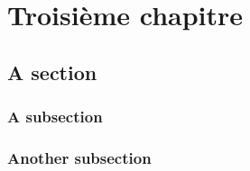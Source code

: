 
\chapter{Troisième chapitre}
\label{chap:anotherchapter}

\myminitoc

\section{A section}

\subsection{A subsection}

\subsection{Another subsection}
